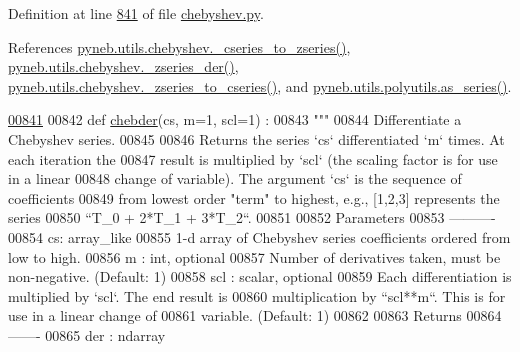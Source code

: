 Definition at line \hyperlink{chebyshev_8py_source_l00841}{841} of file \hyperlink{chebyshev_8py_source}{chebyshev.\-py}.



References \hyperlink{chebyshev_8py_source_l00100}{pyneb.\-utils.\-chebyshev.\-\_\-cseries\-\_\-to\-\_\-zseries()}, \hyperlink{chebyshev_8py_source_l00240}{pyneb.\-utils.\-chebyshev.\-\_\-zseries\-\_\-der()}, \hyperlink{chebyshev_8py_source_l00124}{pyneb.\-utils.\-chebyshev.\-\_\-zseries\-\_\-to\-\_\-cseries()}, and \hyperlink{polyutils_8py_source_l00115}{pyneb.\-utils.\-polyutils.\-as\-\_\-series()}.


\begin{DoxyCode}
\hypertarget{namespacepyneb_1_1utils_1_1chebyshev_l00841}{}\hyperlink{namespacepyneb_1_1utils_1_1chebyshev_a1ed2b9248c247449584904025ec9d460}{00841} 
00842 \textcolor{keyword}{def }\hyperlink{namespacepyneb_1_1utils_1_1chebyshev_a1ed2b9248c247449584904025ec9d460}{chebder}(cs, m=1, scl=1) :
00843     \textcolor{stringliteral}{"""}
00844 \textcolor{stringliteral}{    Differentiate a Chebyshev series.}
00845 \textcolor{stringliteral}{}
00846 \textcolor{stringliteral}{    Returns the series `cs` differentiated `m` times.  At each iteration the}
00847 \textcolor{stringliteral}{    result is multiplied by `scl` (the scaling factor is for use in a linear}
00848 \textcolor{stringliteral}{    change of variable).  The argument `cs` is the sequence of coefficients}
00849 \textcolor{stringliteral}{    from lowest order "term" to highest, e.g., [1,2,3] represents the series}
00850 \textcolor{stringliteral}{    ``T\_0 + 2*T\_1 + 3*T\_2``.}
00851 \textcolor{stringliteral}{}
00852 \textcolor{stringliteral}{    Parameters}
00853 \textcolor{stringliteral}{    ----------}
00854 \textcolor{stringliteral}{    cs: array\_like}
00855 \textcolor{stringliteral}{        1-d array of Chebyshev series coefficients ordered from low to high.}
00856 \textcolor{stringliteral}{    m : int, optional}
00857 \textcolor{stringliteral}{        Number of derivatives taken, must be non-negative. (Default: 1)}
00858 \textcolor{stringliteral}{    scl : scalar, optional}
00859 \textcolor{stringliteral}{        Each differentiation is multiplied by `scl`.  The end result is}
00860 \textcolor{stringliteral}{        multiplication by ``scl**m``.  This is for use in a linear change of}
00861 \textcolor{stringliteral}{        variable. (Default: 1)}
00862 \textcolor{stringliteral}{}
00863 \textcolor{stringliteral}{    Returns}
00864 \textcolor{stringliteral}{    -------}
00865 \textcolor{stringliteral}{    der : ndarray}

\end{DoxyCode}
